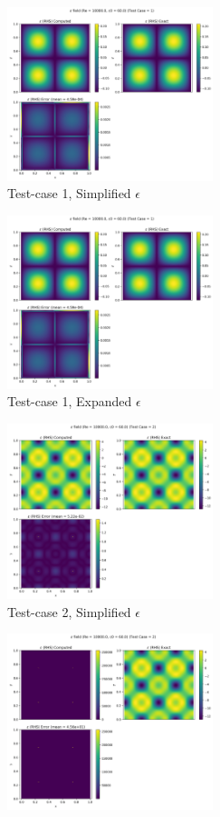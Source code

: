 \begin{figure}[htbp!]
  \begin{subfigure}{7cm}
    \centering\includegraphics[width=6cm]{Code-Figures/keps/keps-op-conv/c0_60_ke_expd_no_ketc_1_nx_150_re_10000/eps_rhs.png}
    \caption{Test-case 1, Simplified $\epsilon$}
  \end{subfigure}
  \begin{subfigure}{7cm}
    \centering\includegraphics[width=6cm]{Code-Figures/keps/keps-op-conv/c0_60_ke_expd_yes_ketc_1_nx_150_re_10000/eps_rhs.png}
    \caption{Test-case 1, Expanded $\epsilon$}
  \end{subfigure}
  \begin{subfigure}{7cm}
    \centering\includegraphics[width=6cm]{Code-Figures/keps/keps-op-conv/c0_60_ke_expd_no_ketc_2_nx_150_re_10000/eps_rhs.png}
    \caption{Test-case 2, Simplified $\epsilon$}
  \end{subfigure}
  \begin{subfigure}{7cm}
    \centering\includegraphics[width=6cm]{Code-Figures/keps/keps-op-conv/c0_60_ke_expd_yes_ketc_2_nx_150_re_10000/eps_rhs.png}

\end{subfigure}
\end{figure}
